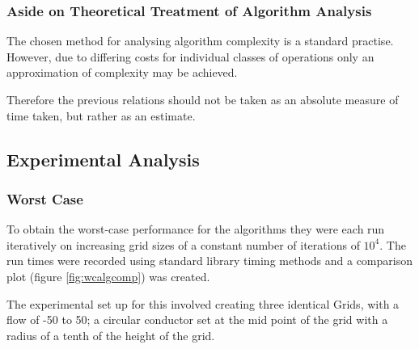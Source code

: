 \documentclass[aps,twocolumn,pre,nofootinbib,10pt]{revtex4-1}
\begin{document}
\subsubsection{Aside on Theoretical Treatment of Algorithm Analysis}

The chosen method for analysing algorithm complexity is a standard practise. However, due to differing costs for individual classes of operations only an approximation of complexity may be achieved.

Therefore the previous relations should not be taken as an absolute measure of time taken, but rather as an estimate.

\subsection{Experimental Analysis}
\subsubsection{Worst Case}

To obtain the worst-case performance for the algorithms they were each run iteratively on increasing grid sizes of a constant number of iterations of $10^4$. The run times were recorded using standard library timing methods and a comparison plot (figure \ref{fig:wcalgcomp}) was created.

The experimental set up for this involved creating three identical Grids, with a flow of -50 to 50; a circular conductor set at the mid point of the grid with a radius of a tenth of the height of the grid.
\end{document}
